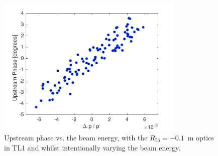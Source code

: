 \begin{figure}
  \centering
  \includegraphics[width=0.8\textwidth]{Figures/propagation/R56ScanGunWiggle_UpEnCorr}
  \caption{Upstream phase vs. the beam energy, with the \(R_{56}=-0.1\)~m optics in TL1 and whilst intentionally varying the beam energy.}
  \label{f:R56ScanGunWiggle_UpEnCorr}
\end{figure}

